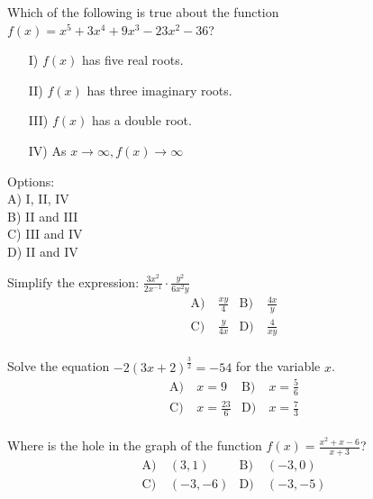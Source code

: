 \begin{problem}\label{AI-Algebra6}
Which of the following is true about the function \( f(x) = x^5 + 3x^4 + 9x^3 - 23x^2 - 36 \)?

\begin{enumerate}
\item[I)] \( f(x) \) has five real roots.
\item[II)] \( f(x) \) has three imaginary roots.
\item[III)] \( f(x) \) has a double root.
\item[IV)] As \( x \to \infty, f(x) \to \infty \)
\end{enumerate}

\noindent Options:\\
A) I, II, IV\\
B) II and III\\
C) III and IV\\
D) II and IV
\end{problem}


\begin{problem}\label{Alg2-24}
Simplify the expression: $\frac{3 x^{2}}{2 x^{-1}} \cdot \frac{y^{2}}{6 x^{2} y}$
\begin{align*}
\text{A)}\ & \frac{x y}{4}  &
\text{B)}\ & \frac{4 x}{y} \\
\text{C)}\ & \frac{y}{4 x} &
\text{D)}\ & \frac{4}{x y}\\
\end{align*}    
\end{problem}


\begin{problem}\label{Alg2-25}
Solve the equation $-2(3 x+2)^{\frac{3}{2}}=-54$ for the variable $x$.
\begin{align*}
\text{A)}\ & x=9 &
\text{B)}\ & x=\frac{5}{6} \\
\text{C)}\ & x=\frac{23}{6} &
\text{D)}\ & x=\frac{7}{3} \\
\end{align*}    
\end{problem}


\begin{problem}\label{Alg2-26}
Where is the hole in the graph of the function $f(x)=\frac{x^{2}+x-6}{x+3}$?
\begin{align*}
\text{A)}\ & (3,1) &
\text{B)}\ & (-3,0) \\
\text{C)}\ & (-3,-6) &
\text{D)}\ & (-3,-5)\\
\end{align*}    
\end{problem}


